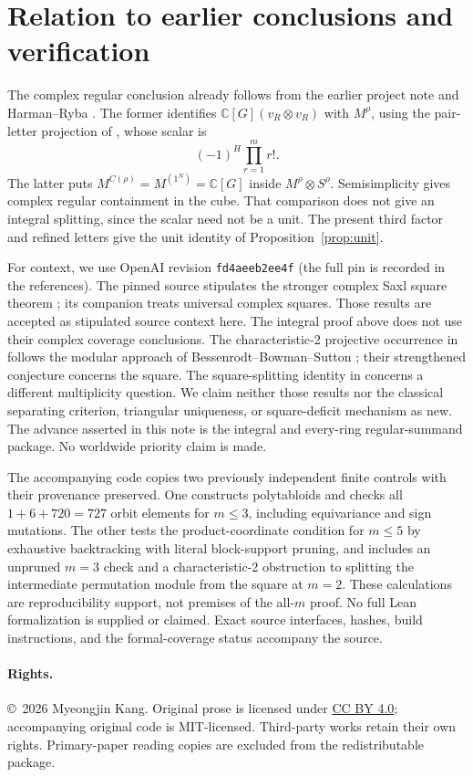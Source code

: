 \documentclass[11pt]{article}
\newcommand{\C}{\mathbb C}
\numberwithin{equation}{section}
\begin{document}
\section{Relation to earlier conclusions and verification}\label{sec:boundary}
The complex regular conclusion already follows from the earlier project note \cite[Section~2.1]{I21} and Harman--Ryba \cite[Theorem~2.4]{HR}. The former identifies $\C[G](v_R\otimes v_R)$ with $M^\rho$, using the pair-letter projection of \cite{OAI}, whose scalar is
\[
 (-1)^H\prod_{r=1}^m r!.
\]
The latter puts $M^{C(\rho)}=M^{(1^N)}=\C[G]$ inside $M^\rho\otimes S^\rho$. Semisimplicity gives complex regular containment in the cube. That comparison does not give an integral splitting, since the scalar need not be a unit. The present third factor and refined letters give the unit identity of Proposition~\ref{prop:unit}.

For context, we use OpenAI revision \texttt{fd4aeeb2ee4f} (the full pin is recorded in the references). The pinned source stipulates the stronger complex Saxl square theorem \cite[Theorem~3.1, \texttt{thm:cyclic-saxl}]{OAI}; its companion \cite{Universal} treats universal complex squares. Those results are accepted as stipulated source context here. The integral proof above does not use their complex coverage conclusions. The characteristic-2 projective occurrence in \cite{HR} follows the modular approach of Bessenrodt--Bowman--Sutton \cite[Section~5]{BBS}; their strengthened conjecture concerns the square. The square-splitting identity in \cite[Theorem~3.7]{BB} concerns a different multiplicity question. We claim neither those results nor the classical separating criterion, triangular uniqueness, or square-deficit mechanism as new. The advance asserted in this note is the integral and every-ring regular-summand package. No worldwide priority claim is made.

The accompanying code copies two previously independent finite controls with their provenance preserved. One constructs polytabloids and checks all $1+6+720=727$ orbit elements for $m\le3$, including equivariance and sign mutations. The other tests the product-coordinate condition for $m\le5$ by exhaustive backtracking with literal block-support pruning, and includes an unpruned $m=3$ check and a characteristic-2 obstruction to splitting the intermediate permutation module from the square at $m=2$. These calculations are reproducibility support, not premises of the all-$m$ proof. No full Lean formalization is supplied or claimed. Exact source interfaces, hashes, build instructions, and the formal-coverage status accompany the source.

\paragraph{Rights.}
\copyright\ 2026 Myeongjin Kang. Original prose is licensed under \href{https://creativecommons.org/licenses/by/4.0/}{CC BY 4.0}; accompanying original code is MIT-licensed. Third-party works retain their own rights. Primary-paper reading copies are excluded from the redistributable package.


\end{document}
